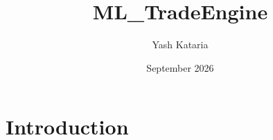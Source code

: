 \documentclass{article}
\title{ML_TradeEngine}
\author{Yash Kataria}
\date{September 2026}
\begin{document}
\maketitle

\section{Introduction}
\end{document}
